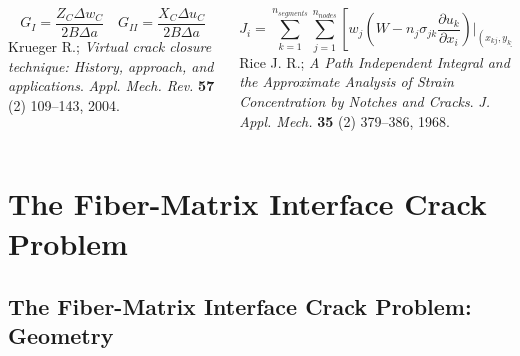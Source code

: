 \documentclass[first,firstsupp,lastsupp,last,hyperref,table]{ETHclass}
\begin{document}
\begin{frame}
\begin{columns}[c]
\begin{column}{0.5\textwidth}
\begin{figure}
  \label{fig:jintegral}
\end{figure}
\end{column}
\end{columns}
\vspace{-0.5cm}
\begin{columns}[t]
\begin{column}{0.4\textwidth}
\centering
\scriptsize\raggedright
\begin{equation*}
G_{I}=\frac{Z_{C}\Delta w_{C}}{2B\Delta a}\quad G_{II}=\frac{X_{C}\Delta u_{C}}{2B\Delta a}
\end{equation*}
{\tiny Krueger R.; {\em\tiny Virtual crack closure technique: History, approach, and applications}. {\it\tiny Appl. Mech. Rev.} {\bf\tiny 57} (2) 109--143, 2004.}
\end{column}
\begin{column}{0.6\textwidth}
\centering
\scriptsize\raggedleft
\begin{equation*}
J_{i}=\sum_{k=1}^{n_{segments}}\sum_{j=1}^{n_{nodes}}\left[w_{j}\left(W-n_{j}\sigma_{jk}\frac{\partial u_{k}}{\partial x_{i}}\right)\bigg|_{\left(x_{kj},y_{kj}\right)}\right]
\end{equation*}
{\tiny Rice J. R.; {\em\tiny A Path Independent Integral and the Approximate Analysis of Strain Concentration by Notches and Cracks}. {\it\tiny J. Appl. Mech.} {\bf\tiny 35} (2) 379--386, 1968.}
\end{column}
\end{columns}
\end{frame}

\section[The Fiber-Matrix Interface Crack Problem]{The Fiber-Matrix Interface Crack Problem}

\subsection[Geometry]{The Fiber-Matrix Interface Crack Problem: Geometry}
\end{document}
